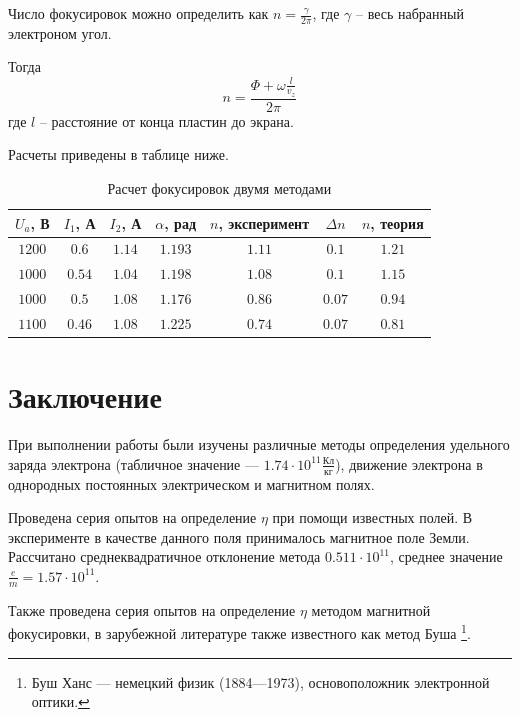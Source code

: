 Число фокусировок можно определить как $n=\frac{\gamma}{2\pi}$, где $\gamma$ -- весь набранный электроном угол.

Тогда
\begin{equation}
	n=\frac{\Phi+\omega\frac{l}{v_z}}{2\pi}
\end{equation}
где $l$ -- расстояние от конца пластин до экрана.

Расчеты приведены в таблице ниже.

\begin{table}[ht!]
\begin{center}
\begin{tabular}{|c|c|c|c|c|c|c|}

\hline
$U_a$, В & $I_1$, А & $I_2$, А & $\alpha$, рад & $n$, эксперимент & $\Delta{n}$ & $n$, теория\\
\hline
$1200$ & $0.6$ 	& $1.14$ & $1.193$ 	& $1.11$ & $0.1$  	& $1.21$ \\ \hline
$1000$ & $0.54$ & $1.04$ & $1.198$ 	& $1.08$ & $0.1$ 	& $1.15$ \\ \hline
$1000$ & $0.5$ 	& $1.08$ & $1.176$ 	& $0.86$ & $0.07$  	& $0.94$ \\ \hline
$1100$ & $0.46$ & $1.08$ & $1.225$	& $0.74$ & $0.07$ 	& $0.81$ \\ \hline
\end{tabular}
\end{center}
\caption{\label{tab:n1n2}Расчет фокусировок двумя методами}
\end{table} 


\section*{Заключение}

При выполнении работы были изучены различные методы определения удельного заряда электрона (табличное значение --- $1.74\cdot10^{11}\frac{\text{Кл}}{\text{кг}}$), движение электрона в однородных постоянных электрическом и магнитном полях.

Проведена серия опытов на определение $\eta$ при помощи известных полей. В эксперименте в качестве данного поля принималось магнитное поле Земли. Рассчитано среднеквадратичное отклонение метода $0.511\cdot10^{11}$, среднее значение $\frac{e}{m}=1.57\cdot10^{11}$.

Также проведена серия опытов на определение $\eta$ методом магнитной фокусировки, в зарубежной литературе также известного как метод Буша%
\footnote{Буш Ханс --- немецкий физик (1884—1973), основоположник электронной оптики.}.

